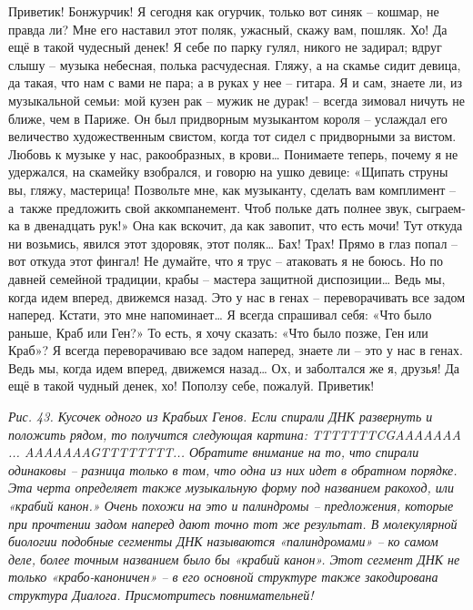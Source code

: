 \documentclass[../main.tex]{subfiles}
\begin{document}
\begin{Dialogue}
 Приветик! Бонжурчик! Я сегодня как огурчик, только вот синяк \--- кошмар, не правда ли? Мне его наставил этот поляк, ужасный, скажу вам, пошляк. Хо! Да ещё в такой чудесный денек! Я себе по парку гулял, никого не задирал; вдруг слышу \--- музыка небесная, полька расчудесная. Гляжу, а на скамье сидит девица, да такая, что нам с вами не пара; а в руках у нее \--- гитара. Я и сам, знаете ли, из музыкальной семьи: мой кузен рак \--- мужик не дурак! \--- всегда зимовал ничуть не ближе, чем в Париже. Он был придворным музыкантом короля \--- услаждал его величество художественным свистом, когда тот сидел с придворными за вистом. Любовь к музыке у нас, ракообразных, в крови\ldots{} Понимаете теперь, почему я не удержался, на скамейку взобрался, и говорю на ушко девице: «Щипать струны вы, гляжу, мастерица! Позвольте мне, как музыканту, сделать вам комплимент \--- а~также предложить свой аккомпанемент. Чтоб польке дать полнее звук, сыграем-ка в двенадцать рук!» Она как вскочит, да как завопит, что есть мочи! Тут откуда ни возьмись, явился этот здоровяк, этот поляк\ldots{} Бах! Трах! Прямо в глаз попал \--- вот откуда этот фингал! Не думайте, что я трус \--- атаковать я не боюсь. Но по давней семейной традиции, крабы \--- мастера защитной диспозиции\ldots{} Ведь мы, когда идем вперед, движемся назад. Это у нас в генах \--- переворачивать все задом наперед. Кстати, это мне напоминает\ldots{} Я всегда спрашивал себя: «Что было раньше, Краб или Ген?» То есть, я хочу сказать: «Что было позже, Ген или Краб»? Я всегда переворачиваю все задом наперед, знаете ли \--- это у нас в генах. Ведь мы, когда идем вперед, движемся назад\ldots{} Ох, и заболтался же я, друзья! Да ещё в такой чудный денек, хо! Поползу себе, пожалуй. Приветик!


\emph{Рис. 43. Кусочек одного из Крабьих Генов. Если спирали ДНК развернуть и положить рядом, то получится следующая картина: TTTTTTTCGAAAAAAA ... AAAAAAAGTTTTTTTT... Обратите внимание на то, что спирали одинаковы \--- разница только в том, что одна из них идет в обратном порядке. Эта черта определяет также музыкальную форму под названием ракоход, или «крабий канон.» Очень похожи на это и палиндромы \--- предложения, которые при прочтении задом наперед дают точно тот же результат. В молекулярной биологии подобные сегменты ДНК называются «палиндромами» \--- ко самом деле, более точным названием было бы «крабий канон». Этот сегмент ДНК не только «крабо-каноничен» \--- в его основной структуре также закодирована структура Диалога. Присмотритесь повнимательней!}


\end{Dialogue}
\end{document}

